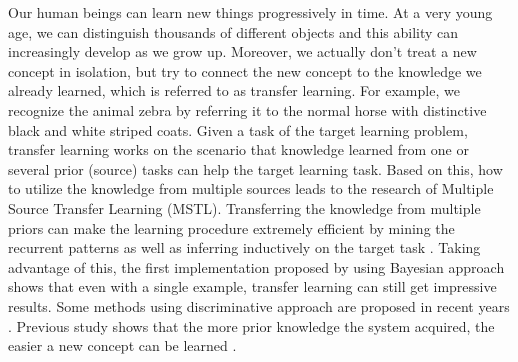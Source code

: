 Our human beings can learn new things progressively in time. At a very young age, we can distinguish thousands of different objects and this ability can increasingly develop as we grow up. Moreover, we actually don't treat a new concept in isolation, but try to connect the new concept to the knowledge we already learned, which is referred to as transfer learning. For example, we recognize the animal zebra by referring it to the normal horse with distinctive black and white striped coats. Given a task of the target learning problem, transfer learning works on the scenario that knowledge learned from one or several prior (source) tasks can help the target learning task. 
Based on this, how to utilize the knowledge from multiple sources leads to the research of Multiple Source Transfer
Learning (MSTL). Transferring the knowledge from multiple priors can make the learning procedure extremely efficient by mining the recurrent patterns as well as inferring inductively on the target task \cite{tommasi2014learning}. Taking advantage of this, the first implementation proposed by \cite{fei2006one} using Bayesian approach shows that even with a single example, transfer learning can still get impressive results. Some methods using discriminative approach are proposed in recent years \cite{tommasi2014learning} \cite{kuzborskij2013n} \cite{jie2011multiclass}. Previous study shows that the more prior knowledge the system acquired, the easier a new concept can be learned \cite{Thrun96islearning}.

